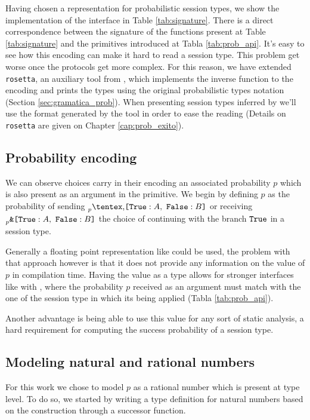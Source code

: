 Having chosen a representation for probabilistic session types, we show the
implementation of the \OCaml interface in Table \ref{tab:signature}. There is a
direct correspondence between the signature of the functions present at Table
\ref{tab:signature} and the primitives introduced at Tabla \ref{tab:prob_api}.
It's easy to see how this encoding can make it hard to read a session type. This
problem get worse once the protocols get more complex. For this reason, we have
extended \texttt{rosetta}, an auxiliary tool from \FuSe, which implements the
inverse function to the encoding and prints the types using the original
probabilistic types notation (Section \ref{sec:gramatica_prob}). When presenting
session types inferred by \OCaml we'll use the format generated by the tool in
order to ease the reading (Details on \texttt{rosetta} are given on Chapter
\ref{cap:prob_exito}).

\subsection{Probability encoding}

We can observe choices carry in their encoding an associated probability $p$
which is also present as an argument in the  primitive. We begin by
defining $p$ as the probability of sending $\BinaryPChoice{\etvar}{\etvarB}$ or
receiving $\BinaryPBranch{\etvar}{\etvarB}$ the choice of continuing with the
branch $\Tag[True]$ in a session type.

Generally a floating point representation like \tfloat could be used, the
problem with that approach however is that it does not provide any information
on the value of $p$ in compilation time. Having the value as a type allows for
stronger interfaces like with , where the probability $p$ received as
an argument must match with the one of the session type in which its being
applied (Tabla \ref{tab:prob_api}).

Another advantage is being able to use this value for any sort of static
analysis, a hard requirement for computing the success probability of a session
type.

\subsection{Modeling natural and rational numbers}

For this work we chose to model $p$ as a rational number which is present at
type level. To do so, we started by writing a type definition for natural
numbers based on the construction through a successor function.

